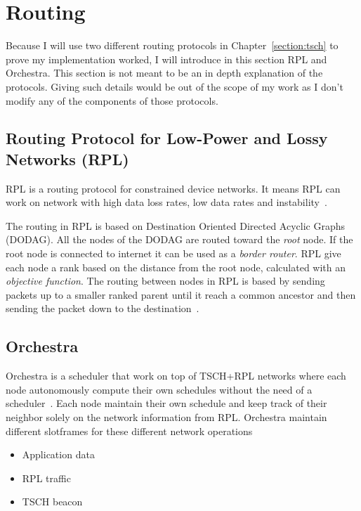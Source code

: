 \section{Routing}

Because I will use two different routing protocols in
Chapter~\ref{section:tsch} to prove my implementation worked, I will introduce
in this section RPL and Orchestra.
This section is not meant to be an in depth explanation of the protocols.
Giving such details would be out of the scope of my work as I don't modify any
of the components of those protocols.

\subsection{Routing Protocol for Low-Power and Lossy Networks (RPL)}

RPL is a routing protocol for constrained device networks.
It means RPL can work on network with high data loss rates, low data rates and
instability~\cite{rfc6550}.

The routing in RPL is based on Destination Oriented Directed Acyclic Graphs (DODAG).
All the nodes of the DODAG are routed toward the \emph{root} node. 
If the root node is connected to internet it can be used as a \emph{border
router}.
RPL give each node a rank based on the distance from the root node, calculated
with an \emph{objective function}.
The routing between nodes in RPL is based by sending packets up to a smaller 
ranked parent until it reach a common ancestor and then sending the packet down
to the destination~\cite{duquennoy2015}.

\subsection{Orchestra}

Orchestra is a scheduler that work on top of TSCH+RPL
networks where each node autonomously compute their own schedules without the
need of a scheduler~\cite{duquennoy2015}.
Each node maintain their own schedule and keep track of their neighbor solely
on the network information from RPL.
Orchestra maintain different slotframes for these different network operations

\begin{itemize}
  \item Application data
  \item RPL traffic
  \item TSCH beacon
\end{itemize}

